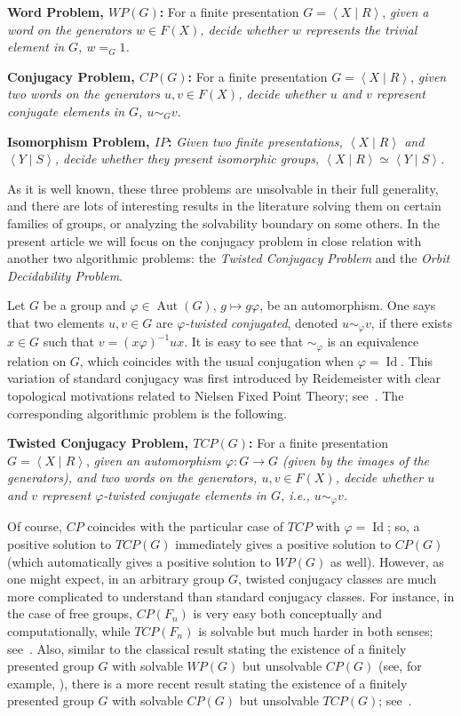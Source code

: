 \documentclass[english]{amsart}
\theoremstyle{definition}
\newcommand{\id}{\operatorname{Id}}
\newcommand{\Aut}{\operatorname{Aut}}
\newcommand{\pres}[2]{\left\langle#1 \mid #2\right\rangle}
\begin{document}
\noindent \textbf{\boldmath Word Problem, $WP(G)$:} For a finite presentation $G=\pres{X}{R}$, \emph{given a word on the generators $w\in F(X)$, decide whether $w$ represents the trivial element in $G$, $w=_G 1$.}

\noindent \textbf{\boldmath Conjugacy Problem, $CP(G)$:} For a finite presentation $G=\pres{X}{R}$, \emph{given two words on the generators $u,v\in F(X)$, decide whether $u$ and $v$ represent conjugate elements in $G$, $u\sim_G v$.}

\noindent \textbf{\boldmath Isomorphism Problem, $IP$:} \emph{Given two finite presentations, $\pres{X}{R}$ and $\pres{Y}{S}$, decide whether they present isomorphic groups, $\pres{X}{R}\simeq \pres{Y}{S}$.}

As it is well known, these three problems are unsolvable in their full generality, and there are lots of interesting results in the literature solving them on certain families of groups, or analyzing the solvability boundary on some others. In the present article we will focus on the conjugacy problem in close relation with another two algorithmic problems: the \textit{Twisted Conjugacy Problem} and the \textit{Orbit Decidability Problem}.

Let $G$ be a group and $\varphi \in \Aut(G)$, $g\mapsto g\varphi$, be an automorphism. One says that two elements $u,v \in G$ are \emph{$\varphi$-twisted conjugated}, denoted $u\sim_\varphi v$, if there exists $x\in G$ such that $v=(x\varphi )^{-1}ux$. It is easy to see that $\sim_\varphi$ is an equivalence relation on $G$, which coincides with the usual conjugation when $\varphi=\id$. This variation of standard conjugacy was first introduced by Reidemeister with clear topological motivations related to Nielsen Fixed Point Theory; see~\cite{R}. The corresponding algorithmic problem is the following.

\noindent \textbf{\boldmath Twisted Conjugacy Problem, $TCP(G)$:} For a finite presentation $G=\pres{X}{R}$, \emph{given an automorphism $\varphi\colon G\to G$ (given by the images of the generators), and two words on the generators, $u,v\in F(X)$, decide whether $u$ and $v$ represent $\varphi$-twisted conjugate elements in $G$, i.e., $u\sim_{\varphi} v$.}

Of course, $CP$ coincides with the particular case of $TCP$ with $\varphi=\id$; so, a positive solution to $TCP(G)$ immediately gives a positive solution to $CP(G)$ (which automatically gives a positive solution to $WP(G)$ as well). However, as one might expect, in an arbitrary group $G$, twisted conjugacy classes are much more complicated to understand than standard conjugacy classes. For instance, in the case of free groups, $CP(F_n)$ is very easy both conceptually and computationally, while $TCP(F_n)$ is solvable but much harder in both senses; see~\cite[Theorem 1.5]{BMMV}. Also, similar to the classical result stating the existence of a finitely presented group $G$ with solvable $WP(G)$ but unsolvable $CP(G)$ (see, for example, \cite{M}), there is a more recent result stating the existence of a finitely presented group $G$ with solvable $CP(G)$ but unsolvable $TCP(G)$; see~\cite[Corollary 4.9]{BMV}.
\end{document}
